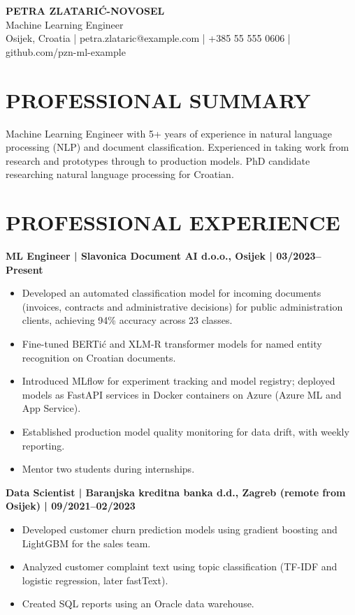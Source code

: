 \documentclass[11pt,a4paper]{article}
\begin{document}
\begin{center}
{\Huge\bfseries\color{primarycolor} PETRA ZLATARIĆ-NOVOSEL}\\[0.3em]
{\large\color{accentcolor} Machine Learning Engineer}\\[0.25em]
{\small Osijek, Croatia | petra.zlataric@example.com | +385 55 555 0606 | github.com/pzn-ml-example}
\end{center}
\vspace{0.3em}

\section*{PROFESSIONAL SUMMARY}
Machine Learning Engineer with 5+ years of experience in natural language processing (NLP) and document classification. Experienced in taking work from research and prototypes through to production models. PhD candidate researching natural language processing for Croatian.

\section*{PROFESSIONAL EXPERIENCE}
\textbf{ML Engineer | Slavonica Document AI d.o.o., Osijek | 03/2023–Present}
\begin{itemize}
\item Developed an automated classification model for incoming documents (invoices, contracts and administrative decisions) for public administration clients, achieving 94\% accuracy across 23 classes.
\item Fine-tuned BERTić and XLM-R transformer models for named entity recognition on Croatian documents.
\item Introduced MLflow for experiment tracking and model registry; deployed models as FastAPI services in Docker containers on Azure (Azure ML and App Service).
\item Established production model quality monitoring for data drift, with weekly reporting.
\item Mentor two students during internships.
\end{itemize}

\textbf{Data Scientist | Baranjska kreditna banka d.d., Zagreb (remote from Osijek) | 09/2021–02/2023}
\begin{itemize}
\item Developed customer churn prediction models using gradient boosting and LightGBM for the sales team.
\item Analyzed customer complaint text using topic classification (TF-IDF and logistic regression, later fastText).
\item Created SQL reports using an Oracle data warehouse.
\end{itemize}
\end{document}

